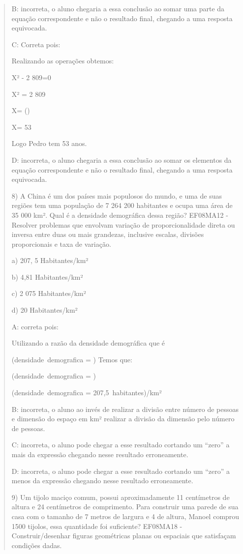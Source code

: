 \begin{quote}
\begin{escolha}
B: incorreta, o aluno chegaria a essa conclusão ao somar uma parte da
equação correspondente e não o resultado final, chegando a uma resposta
equivocada.

C: Correta pois:

Realizando as operações obtemos:

X² - 2 809=0

X² = 2 809

X= ()

X= 53

Logo Pedro tem 53 anos.

D: incorreta, o aluno chegaria a essa conclusão ao somar os elementos da
equação correspondente e não o resultado final, chegando a uma resposta
equivocada.

8) A China é um dos países mais populosos do mundo, e uma de suas
regiões tem uma população de 7 264 200 habitantes e ocupa uma área de 35
000 km². Qual é a densidade demográfica dessa região? EF08MA12 -
Resolver problemas que envolvam variação de proporcionalidade direta ou
inversa entre duas ou mais grandezas, inclusive escalas, divisões
proporcionais e taxa de variação.

a) 207, 5 Habitantes/km²

b) 4,81 Habitantes/km²

c) 2 075 Habitantes/km²

d) 20 Habitantes/km²

A: correta pois:

Utilizando a razão da densidade demográfica que é

(densidade\ demografica = )
Temos que:

(densidade\ demografica = )

(densidade\ demografica = 207,5\ habitantes)/km²

B: incorreta, o aluno ao invés de realizar a divisão entre número de
pessoas e dimensão do espaço em km² realizar a divisão da dimensão pelo
número de pessoas.

C: incorreta, o aluno pode chegar a esse resultado cortando um ``zero''
a mais da expressão chegando nesse resultado erroneamente.

D: incorreta, o aluno pode chegar a esse resultado cortando um ``zero''
a menos da expressão chegando nesse resultado erroneamente.

9) Um tijolo maciço comum, possui aproximadamente 11 centímetros de
altura e 24 centímetros de comprimento. Para construir uma parede de sua
casa com o tamanho de 7 metros de largura e 4 de altura, Manoel comprou
1500 tijolos, essa quantidade foi suficiente? EF08MA18 -
Construir/desenhar figuras geométricas planas ou espaciais que
satisfaçam condições dadas.


\end{escolha}
\end{quote}
